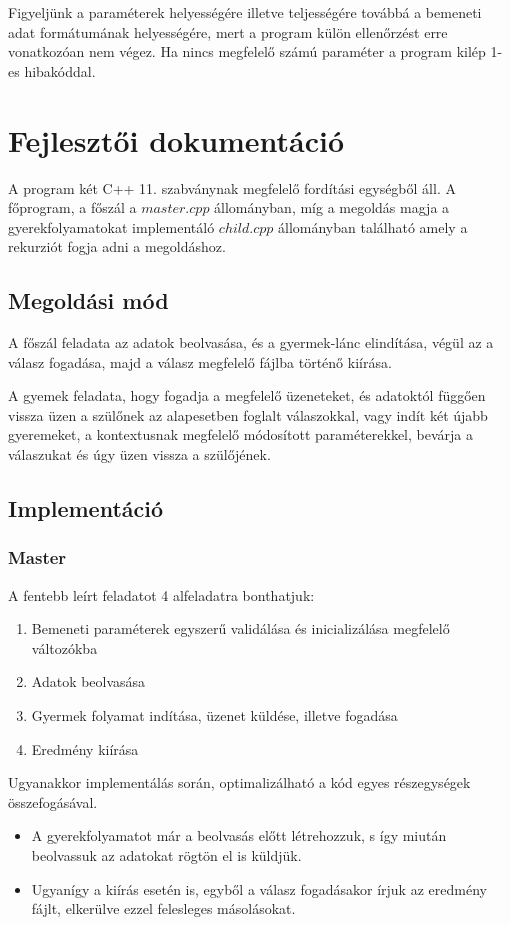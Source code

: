 \documentclass[12pt]{article}
\begin{document}
Figyeljünk a paraméterek helyességére illetve teljességére továbbá a bemeneti adat formátumának helyességére, mert a program külön ellenőrzést erre vonatkozóan nem végez. Ha nincs megfelelő számú paraméter a program kilép 1-es hibakóddal.

\section{Fejlesztői dokumentáció}

A program két C++ 11. szabványnak megfelelő fordítási egységből áll. A főprogram, a főszál a $master.cpp$ állományban, míg a megoldás magja a gyerekfolyamatokat implementáló $child.cpp$ állományban található amely a rekurziót fogja adni a megoldáshoz.

\subsection{Megoldási mód}


A főszál feladata az adatok beolvasása, és a gyermek-lánc elindítása, végül az a válasz fogadása, majd a válasz megfelelő fájlba történő kiírása.

A gyemek feladata, hogy fogadja a megfelelő üzeneteket, és adatoktól függően vissza üzen a szülőnek az alapesetben foglalt válaszokkal, vagy indít két újabb gyeremeket, a kontextusnak megfelelő módosított paraméterekkel, bevárja a válaszukat és úgy üzen vissza a szülőjének.

\subsection{Implementáció}
	\subsubsection{Master}
    
    A fentebb leírt feladatot 4 alfeladatra bonthatjuk:
    \begin{enumerate}
    \item Bemeneti paraméterek egyszerű validálása és inicializálása megfelelő változókba
    \item Adatok beolvasása
    \item Gyermek folyamat indítása, üzenet küldése, illetve fogadása
    \item Eredmény kiírása
	\end{enumerate}
    
    Ugyanakkor implementálás során, optimalizálható a kód egyes részegységek összefogásával.
    \begin{itemize}
    \item A gyerekfolyamatot már a beolvasás előtt létrehozzuk, s így miután beolvassuk az adatokat rögtön el is küldjük.
    \item Ugyanígy a kiírás esetén is, egyből a válasz fogadásakor írjuk az eredmény fájlt, elkerülve ezzel felesleges másolásokat.
    \end{itemize}
    
\end{document}
